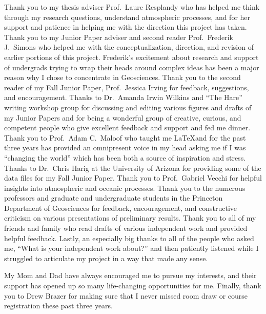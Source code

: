 
Thank you to my thesis adviser Prof.~Laure Resplandy who has helped me think through my research questions, understand atmospheric processes, and for her support and patience in helping me with the direction this project has taken.
Thank you to my Junior Paper adviser and second reader Prof.~Frederik J.~Simons who helped me with
the conceptualization, direction, and revision of earlier portions of this project. Frederik's excitement about research and support of undergrads trying to wrap their heads around complex ideas has been a major reason why I chose to concentrate in Geosciences. Thank you to the second reader of my Fall Junior Paper, Prof.~Jessica Irving for feedback, suggestions, and encouragement. Thanks to Dr.~Amanda
Irwin Wilkins and ``The Hare'' writing workshop group for discussing
and editing various figures and drafts of my Junior Papers and for being a wonderful group of creative, curious, and competent people who give excellent feedback and support and fed me dinner. Thank you to Prof.~Adam C.~Maloof who taught me \LaTeX and for the past three years has provided an omnipresent voice in my head asking me if I was ``changing the world'' which has been both a source of inspiration and stress. Thanks to Dr.~Chris Harig at the University of Arizona for providing some of the data files for my Fall Junior Paper. Thank you to Prof.~Gabriel Vecchi for helpful insights into atmospheric and oceanic processes. Thank you to the numerous professors and graduate and undergraduate students in the Princeton Department of Geosciences for feedback, encouragement, and constructive criticism on various presentations of preliminary results. Thank you to all of my friends and family who read drafts of various independent work and provided helpful feedback. Lastly, an especially big thanks to all of the people who asked me, ``What is your independent work about?'' and then patiently listened while I struggled to articulate my project in a way that made any sense.

My Mom and Dad have always encouraged me to pursue my interests, and their support has opened up so many life-changing opportunities for me. Finally, thank you to Drew Brazer for making sure that I never missed room draw or course registration these past three years.

